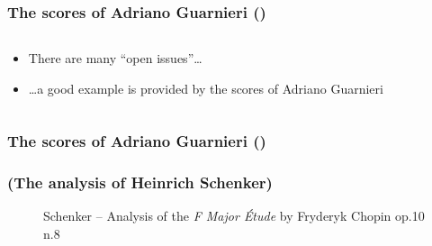 \setcounter{ms}{0}
\begin{frame}
    \frametitle<+- | alert@+->{The scores of Adriano Guarnieri ()}

    \begin{columns}[T]
        \begin{column}{0.7\textwidth}
				    \begin{itemize}[<+- | alert@+->]
				       \item There are many ``open issues''\dots
				       \item \dots a good example is provided by the scores of Adriano
											 Guarnieri
				    \end{itemize}
        \end{column}
        \begin{column}{0.3\textwidth}
        \end{column}
    \end{columns}
    
\end{frame}

\begin{frame}
    \frametitle{The scores of Adriano Guarnieri ()}

		\vspace{-0.4cm}
		\begin{figure}[H!]
       \href{run:\imagedir/Guarnieri-Passione-Lettera_M.jpg}
             {}
			 \caption{}
		\end{figure}

\end{frame}

\begin{frame}
    \frametitle{(The analysis of Heinrich Schenker)}

    \begin{center}
        \begin{figure}
						\caption{\alert{Schenker -- Analysis of the \emph{F Major \'Etude} by Fryderyk Chopin op.10 n.8}}
        \end{figure}
    \end{center}

\end{frame}
